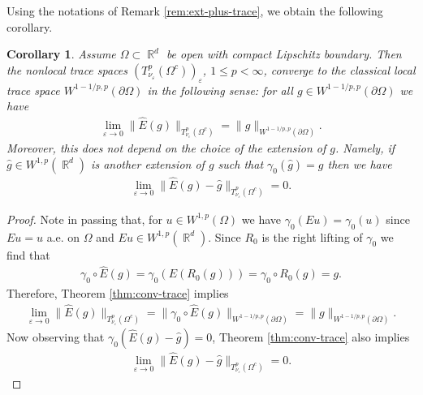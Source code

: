 \documentclass[12pt, reqno]{amsart}%
\theoremstyle{plain}  %
\newtheorem{corollary}[theorem]{Corollary}
\theoremstyle{definition}  %
\numberwithin{equation}{section}
\DeclareMathOperator{\R}{\mathbb{R}}
\newcommand{\eps}{\varepsilon}
\begin{document}
\noindent Using the notations of Remark \ref{rem:ext-plus-trace}, we obtain the following corollary.
\begin{corollary}\label{cor:conv-trace}
Assume $\Omega\subset\R^d$ be open with compact Lipschitz boundary.
Then the nonlocal trace spaces $(T^p_{\nu_\eps}(\Omega^c))_\eps$, $1\leq p<\infty$, converge to the classical  local trace  space
$W^{1-1/p ,p}(\partial\Omega)$ in the following sense: for all $g\in W^{1-1/p ,p}(\partial\Omega)$ we have
\begin{align*}
\lim_{\eps\to0}	\|\widehat{E}(g)\|_{T^p_{\nu_\eps}(\Omega^c)}=
\|g\|_{W^{1-1/p ,p}(\partial\Omega)}.
\end{align*}
Moreover, this does not depend on the choice of the extension of $g$. Namely, if $\widehat{g}\in W^{1,p}(\R^d)$ is another  extension of $g$ such that $\gamma_0(\widehat{g})= g$ then we have
\begin{align*}
\lim_{\eps\to0}	\|\widehat{E}(g) -\widehat{g}\|_{T^p_{\nu_\eps}(\Omega^c)}=0.
\end{align*}
\end{corollary}
\begin{proof}
Note in passing that, for $u\in W^{1,p}(\Omega)$ we have $\gamma_0(Eu)= \gamma_0(u)$ since $Eu= u$ a.e. on $\Omega$ and $Eu\in W^{1,p}(\R^d)$. Since $R_0$ is the right lifting of $\gamma_0$ we find that
\begin{align*}
\gamma_0\circ \widehat{E} (g)  = \gamma_0( E (R_0(g))) = \gamma_0\circ R_0 (g)= g.
\end{align*}
Therefore, Theorem \ref{thm:conv-trace} implies
\begin{align*}
\lim_{\eps\to0}	\|\widehat{E}(g)\|_{T^p_{\nu_\eps}(\Omega^c)}
=\|\gamma_0\circ\widehat{E}(g)\|_{W^{1-1/p ,p}(\partial\Omega)}=
\|g\|_{W^{1-1/p ,p}(\partial\Omega)}.
\end{align*}
Now observing that $\gamma_0(\widehat{E}(g)- \widehat{g})=0$,  Theorem \ref{thm:conv-trace} also implies
\begin{align*}
\lim_{\eps\to0}	\|\widehat{E}(g) -\widehat{g}\|_{T^p_{\nu_\eps}(\Omega^c)}
=0.
\end{align*}
\vspace{-3mm}
\end{proof}
\end{document}
